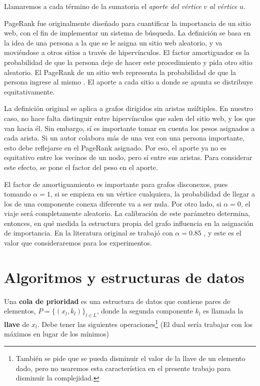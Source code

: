 \documentclass[journal]{IEEEtran}
\begin{document}
Llamaremos a cada término de la sumatoria el \textit{aporte del vértice} \(v\) \textit{al vértice} \(u\).

PageRank fue originalmente diseñado para cuantificar la importancia de un sitio web, con el fin de implementar un sistema de búsqueda. La definición se basa en la idea de una persona a la que se le asigna un sitio web aleatorio, y va moviéndose a otros sitios a través de hipervínculos. El factor amortiguador es la probabilidad de que la persona deje de hacer este procedimiento y pida otro sitio aleatorio. El PageRank de un sitio web representa la probabilidad de que la persona ingrese al mismo \cite{google}. El aporte a cada sitio a donde se apunta se distribuye equitativamente.

La definición original se aplica a grafos dirigidos sin aristas múltiples. En nuestro caso, no hace falta distinguir entre hipervínculos que salen del sitio web, y los que van hacia él. Sin embargo, sí es importante tomar en cuenta los pesos asignados a cada arista. Si un autor colabora más de una vez con una persona importante, esto debe reflejarse en el PageRank asignado. Por eso, el aporte ya no es equitativo entre los vecinos de un nodo, pero sí entre sus aristas. Para considerar este efecto, se pone el factor del peso en el aporte.

El factor de amortiguamiento es importante para grafos disconexos, pues tomando \(\alpha = 1\), si se empieza en un vértice cualquiera, la probabilidad de llegar a los de una componente conexa diferente va a ser nula. Por otro lado, si \(\alpha = 0\), el viaje será completamente aleatorio. La calibración de este parámetro determina, entonces, en qué medida la estructura propia del grafo influencia en la asignación de importancia. En la literatura original se trabajó con \(\alpha = 0.85\) \cite{google}, y este es el valor que consideraremos para los experimentos.

\section{Algoritmos y estructuras de datos}

Una \textbf{cola de prioridad} es una estructura de datos que contiene pares de elementos, \(P = \{(x_l, k_l)\}_{l \in L}\), donde la segunda componente \(k_l\) es llamada la \textbf{llave} de \(x_l\). Debe tener las siguientes operaciones\footnote{También se pide que se pueda disminuir el valor de la llave de un elemento dado, pero no usaremos esta característica en el presente trabajo para disminuir la complejidad.} (El dual sería trabajar con los máximos en lugar de los mínimos) \cite{clrs}
\end{document}
